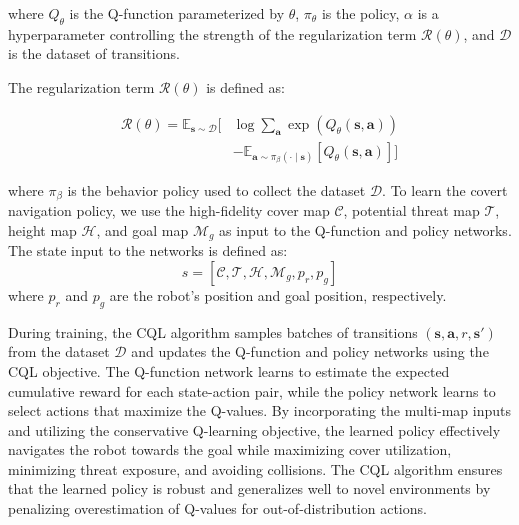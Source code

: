 where $Q_\theta$ is the Q-function parameterized by $\theta$, $\pi_\theta$ is the policy, $\alpha$ is a hyperparameter controlling the strength of the regularization term $\mathcal{R}(\theta)$, and $\mathcal{D}$ is the dataset of transitions.

The regularization term $\mathcal{R}(\theta)$ is defined as:

\begin{equation}
\begin{split}
\mathcal{R}(\theta) = \mathbb{E}_{\mathbf{s} \sim \mathcal{D}} \bigg[ &\log \sum_{\mathbf{a}} \exp(Q_\theta(\mathbf{s}, \mathbf{a})) \\
&- \mathbb{E}_{\mathbf{a} \sim \pi_\beta(\cdot \mid \mathbf{s})}[Q_\theta(\mathbf{s}, \mathbf{a})] \bigg]
\end{split}
\end{equation}


where $\pi_\beta$ is the behavior policy used to collect the dataset $\mathcal{D}$. To learn the covert navigation policy, we use the high-fidelity cover map $\mathcal{C}$, potential threat map $\mathcal{T}$, height map $\mathcal{H}$, and goal map $\mathcal{M}_g$ as input to the Q-function and policy networks. The state input to the networks is defined as:
\begin{equation}
s = [\mathcal{C}, \mathcal{T}, \mathcal{H}, \mathcal{M}_g, p_r, p_g]
\end{equation}
where $p_r$ and $p_g$ are the robot's position and goal position, respectively.

During training, the CQL algorithm samples batches of transitions $(\mathbf{s}, \mathbf{a}, r, \mathbf{s}')$ from the dataset $\mathcal{D}$ and updates the Q-function and policy networks using the CQL objective. The Q-function network learns to estimate the expected cumulative reward for each state-action pair, while the policy network learns to select actions that maximize the Q-values. By incorporating the multi-map inputs and utilizing the conservative Q-learning objective, the learned policy effectively navigates the robot towards the goal while maximizing cover utilization, minimizing threat exposure, and avoiding collisions. The CQL algorithm ensures that the learned policy is robust and generalizes well to novel environments by penalizing overestimation of Q-values for out-of-distribution actions.


